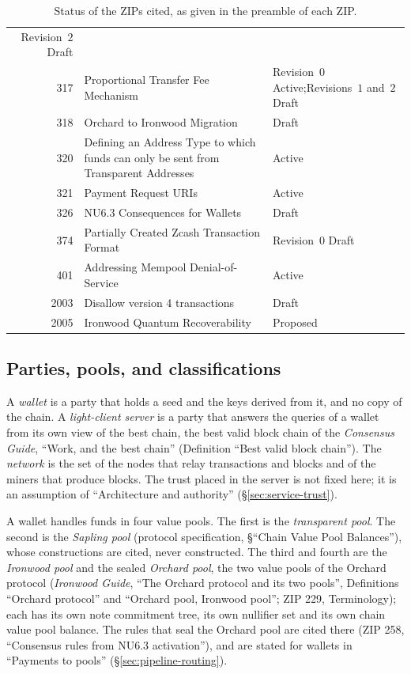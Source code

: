 \documentclass[11pt,a4paper]{article}
\theoremstyle{definition}
\begin{document}
\begin{table}[htbp]
\begin{tabular}{@{}r p{} p{}@{}}
    Revision~$2$ Draft \\
317 & Proportional Transfer Fee Mechanism
  & Revision~$0$ Active;\newline Revisions~$1$ and~$2$ Draft \\
318 & Orchard to Ironwood Migration & Draft \\
320 & Defining an Address Type to which funds can only be sent from
  Transparent Addresses & Active \\
321 & Payment Request URIs & Active \\
326 & NU6.3 Consequences for Wallets & Draft \\
374 & Partially Created Zcash Transaction Format & Revision~$0$ Draft \\
401 & Addressing Mempool Denial-of-Service & Active \\
2003 & Disallow version 4 transactions & Draft \\
2005 & Ironwood Quantum Recoverability & Proposed \\
\bottomrule
\end{tabular}
\caption{Status of the ZIPs cited, as given in the preamble of each ZIP.}
\label{tab:intro-zips}
\end{table}

\subsection{Parties, pools, and classifications}\label{sec:intro-model}

A \emph{wallet} is a party that holds a seed and the keys derived from it,
and no copy of the chain. A \emph{light-client server} is a party that
answers the queries of a wallet from its own view of the best chain, the
best valid block chain of the \emph{Consensus Guide}, ``Work, and the best
chain'' (Definition ``Best valid block chain''). The \emph{network} is the
set of the nodes that relay transactions and blocks and of the miners that
produce blocks. The trust placed in the server is not fixed here; it is an
assumption of ``Architecture and authority'' (\S\ref{sec:service-trust}).

A wallet handles funds in four value pools. The first is the
\emph{transparent pool}. The second is the \emph{Sapling pool} (protocol
specification, \S``Chain Value Pool Balances''), whose constructions are
cited, never constructed. The third and fourth are the \emph{Ironwood pool}
and the sealed \emph{Orchard pool}, the two value pools of the Orchard
protocol (\emph{Ironwood Guide}, ``The Orchard protocol and its two pools'',
Definitions ``Orchard protocol'' and ``Orchard pool, Ironwood pool''; ZIP 229,
Terminology); each has its own note commitment tree, its own nullifier set
and its own chain value pool balance. The rules that seal the Orchard pool
are cited there (ZIP 258, ``Consensus rules from NU6.3 activation''), and
are stated for wallets in ``Payments to pools''
(\S\ref{sec:pipeline-routing}).
\end{document}

